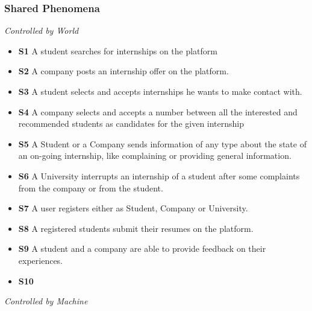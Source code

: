 \documentclass{article}
\begin{document}
\subsubsection{Shared Phenomena}
    \textit{Controlled by World}
    \begin{itemize}
        \item \textbf{S1} A student searches for internships on the platform
        \item \textbf{S2} A company posts an internship offer on the platform.
        \item \textbf{S3} A student selects and accepts internships he wants to make contact with.
        \item \textbf{S4} A company selects and accepts a number between all the interested and recommended students as candidates for the given internship
        \item \textbf{S5} A Student or a Company sends information of any type about the state of an on-going internship, like complaining or providing general information.
        \item \textbf{S6} A University interrupts an internship of a student after some complaints from the company or from the student. 
        \item \textbf{S7} A user registers either as Student, Company or University.
        \item \textbf{S8} A registered students submit their resumes on the platform.
        \item \textbf{S9} A student and a company are able to provide feedback on their experiences.
        \item \textbf{S10}
    \end{itemize}
    \textit{Controlled by Machine}
\end{document}
